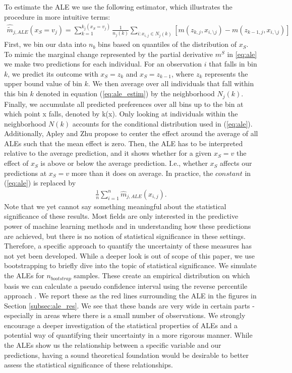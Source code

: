 To estimate the ALE we use the following estimator, which illustrates the procedure in more intuitive terms: 
\begin{align}
    \hat{\tilde{m}}_{j, ALE}(x_S=v_j)=\sum_{k=1}^{k_j(x_S=v_j)} \frac{1}{n_j(k)}\sum_{i:x_{i,j}\in N_j(k)}[m(z_{k,j}, x_{i,\setminus j})-m(z_{k-1,j}, x_{i,\setminus j})] \label{eq:ale_estim}
\end{align}
First, we bin our data into $n_b$ bins based on quantiles of the distribution of $x_S$. To mimic the marginal change represented by the partial derivative $m^S$ in \ref{eq:ale} we make two predictions for each individual. For an observation $i$ that falls in bin $k$, we predict its outcome with $x_S=z_k$ and $x_S=z_{k-1}$, where $z_k$ represents the upper bound value of bin $k$. We then average over all individuals that fall within this bin $k$ denoted in equation (\ref{eq:ale_estim}) by the neighborhood $N_j(k)$. Finally, we accumulate all predicted preferences over all bins up to the bin at which point x falls, denoted by k(x). Only looking at individuals within the neighborhood $N(k)$ accounts for the conditional distribution used in (\ref{eq:ale}). \\
Additionally, Apley and Zhu propose to center the effect around the average of all ALEs such that the mean effect is zero. Then, the ALE has to be interpreted relative to the average prediction, and it shows whether for a given $x_S=v$ the effect of $x_S$ is above or below the average prediction. I.e., whether $x_S$ affects our predictions at $x_S=v$ more than it does on average. In practice, the $constant$ in (\ref{eq:ale}) is replaced by 
\begin{align*}
    \frac{1}{n}\sum_{i=1}^n \hat{m}_{j, ALE}(x_{i, j}).
\end{align*}
Note that we yet cannot say something meaningful about the statistical significance of these results. Most fields are only interested in the predictive power of machine learning methods and in understanding how these predictions are achieved, but there is no notion of statistical significance in these settings. Therefore, a specific approach to quantify the uncertainty of these measures has not yet been developed. While a deeper look is out of scope of this paper, we use bootstrapping to briefly dive into the topic of statistical significance. We simulate the ALEs for $n_{bootstrap}$ samples. These create an empirical distribution on which basis we can calculate a pseudo confidence interval using the reverse percentile approach \citep{davisonhenley_1997}. We report these as the red lines surrounding the ALE in the figures in Section \ref{subsec:ale_res}. We see that these bands are very wide in certain parts - especially in areas where there is a small number of observations. We strongly encourage a deeper investigation of the statistical properties of ALEs and a potential way of quantifying their uncertainty in a more rigorous manner. While the ALEs show us the relationship between a specific variable and our predictions, having a sound theoretical foundation would be desirable to better assess the statistical significance of these relationships. 

